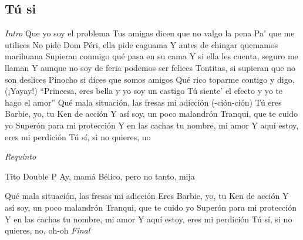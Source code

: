 \subsection{T\'u si}
\noindent

\vspace{1cm}

\begin{guitar}
	\begin{multicols}{2}
		
		\textit{Intro}
	Que yo soy el problema
	Tus amigas dicen que no valgo la pena
	Pa' que me utilices
	No pide Dom Péri, ella pide caguama
	Y antes de chingar quemamos marihuana
	Supieran conmigo qué pasa en su cama
	Y si ella les cuenta, seguro me llaman
	Y aunque no soy de feria podemos ser felices
	Tontitas, si supieran que no son deslices
	Pinocho si dices que somos amigos
	Qué rico toparme contigo y digo, (¡Yayay!)
	``Princesa, eres bella y yo soy un castigo
	Tú siente' el efecto y yo te hago el amor''
	Qué mala situación, las fresas mi adicción (-ción-ción)
	Tú eres Barbie, yo, tu Ken de acción
	Y así soy, un poco malandrón
	Tranqui, que te cuido yo
	Superón para mi protección
	Y en las cachas tu nombre, mi amor
	Y aquí estoy, eres mi perdición
	Tú sí, si no quieres, no
	\par
	\textit{Requinto}
	\par
	Tito Double P
	Ay, mamá
	Bélico, pero no tanto, mija
	\par
	Qué mala situación, las fresas mi adicción
	Eres Barbie, yo, tu Ken de acción
	Y así soy, un poco malandrón
	Tranqui, que te cuido yo
	Superón para mi protección
	Y en las cachas tu nombre, mi amor
	Y aquí estoy, eres mi perdición
	Tú sí, si no quieres, no, oh-oh
		\textit{Final}
	\end{multicols}
\end{guitar}
